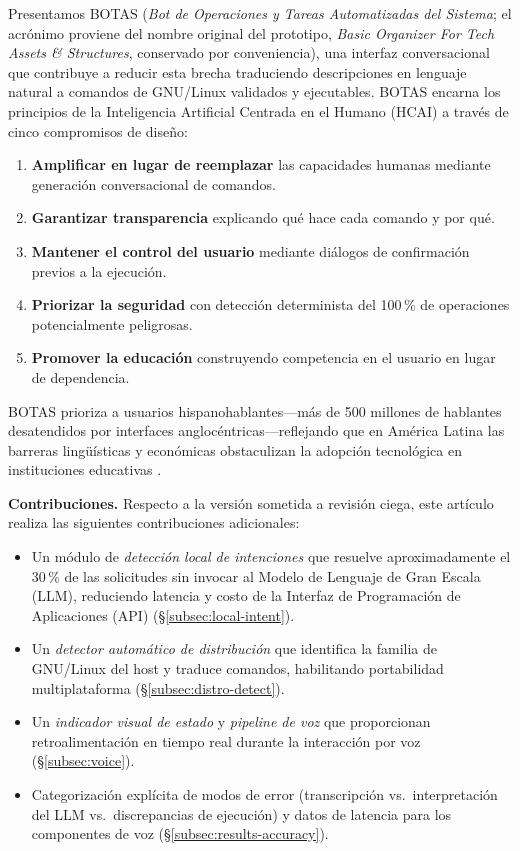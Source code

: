 \documentclass[10pt,a4paper]{article}
\begin{document}
Presentamos BOTAS (\textit{Bot de Operaciones y Tareas Automatizadas del Sistema}; el acr\'{o}nimo proviene del nombre original del prototipo, \textit{Basic Organizer For Tech Assets \& Structures}, conservado por conveniencia), una interfaz conversacional que contribuye a reducir esta brecha traduciendo descripciones en lenguaje natural a comandos de GNU/Linux validados y ejecutables. BOTAS encarna los principios de la Inteligencia Artificial Centrada en el Humano (HCAI) \citep{Shneiderman2020} a trav\'{e}s de cinco compromisos de dise\~{n}o:

\begin{enumerate}[noitemsep,topsep=0pt]
    \item \textbf{Amplificar en lugar de reemplazar} las capacidades humanas mediante generaci\'{o}n conversacional de comandos.
    \item \textbf{Garantizar transparencia} explicando qu\'{e} hace cada comando y por qu\'{e}.
    \item \textbf{Mantener el control del usuario} mediante di\'{a}logos de confirmaci\'{o}n previos a la ejecuci\'{o}n.
    \item \textbf{Priorizar la seguridad} con detecci\'{o}n determinista del 100\,\% de operaciones potencialmente peligrosas.
    \item \textbf{Promover la educaci\'{o}n} construyendo competencia en el usuario en lugar de dependencia.
\end{enumerate}

BOTAS prioriza a usuarios hispanohablantes---m\'{a}s de 500 millones de hablantes desatendidos por interfaces anglocéntricas---reflejando que en Am\'{e}rica Latina las barreras ling\"{u}\'{i}sticas y econ\'{o}micas obstaculizan la adopci\'{o}n tecnol\'{o}gica en instituciones educativas \citep{Warschauer2004, CEPAL2023}.

\noindent\textbf{Contribuciones.} Respecto a la versi\'{o}n sometida a revisi\'{o}n ciega, este art\'{i}culo realiza las siguientes contribuciones adicionales:
\begin{itemize}[noitemsep,topsep=0pt]
    \item Un m\'{o}dulo de \emph{detecci\'{o}n local de intenciones} que resuelve aproximadamente el 30\,\% de las solicitudes sin invocar al Modelo de Lenguaje de Gran Escala (LLM), reduciendo latencia y costo de la Interfaz de Programaci\'{o}n de Aplicaciones (API) (\S\ref{subsec:local-intent}).
    \item Un \emph{detector autom\'{a}tico de distribuci\'{o}n} que identifica la familia de GNU/Linux del host y traduce comandos, habilitando portabilidad multiplataforma (\S\ref{subsec:distro-detect}).
    \item Un \emph{indicador visual de estado} y \emph{pipeline de voz} que proporcionan retroalimentaci\'{o}n en tiempo real durante la interacci\'{o}n por voz (\S\ref{subsec:voice}).
    \item Categorizaci\'{o}n expl\'{i}cita de modos de error (transcripci\'{o}n vs.\ interpretaci\'{o}n del LLM vs.\ discrepancias de ejecuci\'{o}n) y datos de latencia para los componentes de voz (\S\ref{subsec:results-accuracy}).
\end{itemize}
\end{document}
